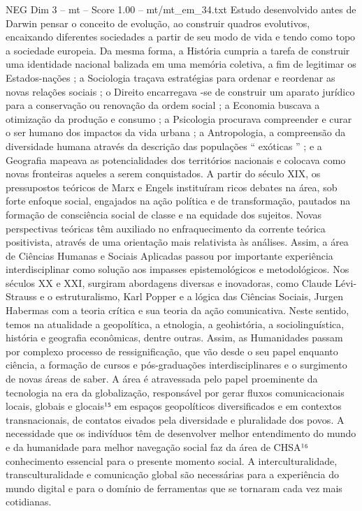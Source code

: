 \begin{textsample}{NEG Dim 3 – mt – Score 1.00 – mt/mt\_em\_34.txt}
Estudo desenvolvido antes de Darwin pensar o conceito de evolução, ao construir quadros evolutivos, encaixando diferentes sociedades a partir de seu modo de vida e tendo como topo a sociedade europeia.
Da mesma forma, a História cumpria a tarefa de construir uma identidade nacional balizada em uma memória coletiva, a fim de legitimar os Estados-nações ; a Sociologia traçava estratégias para ordenar e reordenar as novas relações sociais ; o Direito encarregava -se de construir um aparato jurídico para a conservação ou renovação da ordem social ; a Economia buscava a otimização da produção e consumo ; a Psicologia procurava compreender e curar o ser humano dos impactos da vida urbana ; a Antropologia, a compreensão da diversidade humana através da descrição das populações “ exóticas ” ; e a Geografia mapeava as potencialidades dos territórios nacionais e colocava como novas fronteiras aqueles a serem conquistados.
A partir do século XIX, os pressupostos teóricos de Marx e Engels instituíram ricos debates na área, sob forte enfoque social, engajados na ação política e de transformação, pautados na formação de consciência social de classe e na equidade dos sujeitos.
Novas perspectivas teóricas têm auxiliado no enfraquecimento da corrente teórica positivista, através de uma orientação mais relativista às análises.
Assim, a área de Ciências Humanas e Sociais Aplicadas passou por importante experiência interdisciplinar como solução aos impasses epistemológicos e metodológicos.
Nos séculos XX e XXI, surgiram abordagens diversas e inovadoras, como Claude Lévi-Strauss e o estruturalismo, Karl Popper e a lógica das Ciências Sociais, Jurgen Habermas com a teoria crítica e sua teoria da ação comunicativa.
Neste sentido, temos na atualidade a geopolítica, a etnologia, a geohistória, a sociolinguística, história e geografia econômicas, dentre outras.
Assim, as Humanidades passam por complexo processo de ressignificação, que vão desde o seu papel enquanto ciência, a formação de cursos e pós-graduações interdisciplinares e o surgimento de novas áreas de saber.
A área é atravessada pelo papel proeminente da tecnologia na era da globalização, responsável por gerar fluxos comunicacionais locais, globais e glocais¹⁵ em espaços geopolíticos diversificados e em contextos transnacionais, de contatos eivados pela diversidade e pluralidade dos povos.
A necessidade que os indivíduos têm de desenvolver melhor entendimento do mundo e da humanidade para melhor navegação social faz da área de CHSA¹⁶ conhecimento essencial para o presente momento social.
A interculturalidade, transculturalidade e comunicação global são necessárias para a experiência do mundo digital e para o domínio de ferramentas que se tornaram cada vez mais cotidianas.

\end{textsample}
